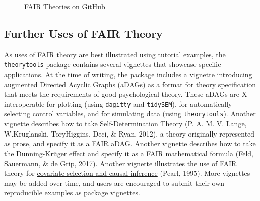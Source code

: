 \documentclass[
  man, noextraspace,floatsintext]{apa6}
\begin{document}
\begin{figure}
\caption{FAIR Theories on GitHub}\label{fig:figgithub}
\end{figure}

\subsection{Further Uses of FAIR Theory}\label{further-uses-of-fair-theory}

As uses of FAIR theory are best illustrated using tutorial examples,
the \texttt{theorytools} package contains several vignettes that showcase specific applications.
At the time of writing, the package includes a
vignette \href{https://cjvanlissa.github.io/theorytools/articles/augmented_dags.html}{introducing augmented Directed Acyclic Graphs (aDAGs)} as a format for theory specification that meets the requirements of good psychological theory.
These aDAGs are X-interoperable for plotting (using \texttt{dagitty} and \texttt{tidySEM}),
for automatically selecting control variables, and for simulating data (using \texttt{theorytools}).
Another vignette describes how to take Self-Determination Theory (P. A. M. V. Lange, W.Kruglanski, ToryHiggins, Deci, \& Ryan, 2012), a theory originally represented as prose, and \href{https://cjvanlissa.github.io/theorytools/articles/formalizing_sdt.html}{specify it as a FAIR aDAG}.
Another vignette describes how to take the Dunning-Krüger effect and \href{https://cjvanlissa.github.io/theorytools/articles/dunning-kruger.html}{specify it as a FAIR mathematical formula} (Feld, Sauermann, \& de Grip, 2017).
Another vignette illustrates the use of FAIR theory for \href{https://cjvanlissa.github.io/theorytools/articles/causal-inference.html}{covariate selection and causal inference} (Pearl, 1995).
More vignettes may be added over time, and users are encouraged to submit their own reproducible examples as package vignettes.
\end{document}
